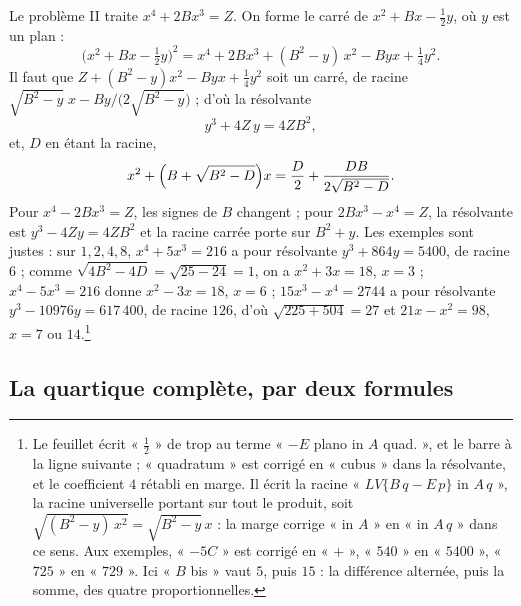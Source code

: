 \documentclass[11pt,a4paper]{article}
\begin{document}
Le problème II traite $x^4 + 2Bx^3 = Z$. On forme le carré de
$x^2 + Bx - \tfrac12 y$, où $y$ est un plan :
\[ \bigl(x^2 + Bx - \tfrac12 y\bigr)^2 = x^4 + 2Bx^3 + (B^2 - y)\,x^2 - Byx
   + \tfrac14 y^2 . \]
Il faut que $Z + (B^2 - y)x^2 - Byx + \tfrac14 y^2$ soit un carré, de racine
$\sqrt{B^2 - y}\;x - By/\bigl(2\sqrt{B^2 - y}\bigr)$ ; d'où la résolvante
\[ y^3 + 4Z\,y = 4ZB^2 , \]
et, $D$ en étant la racine,
\[ x^2 + \Bigl(B + \sqrt{B^2 - D}\Bigr)x = \frac{D}{2} + \frac{DB}{2\sqrt{B^2 - D}} . \]
Pour $x^4 - 2Bx^3 = Z$, les signes de $B$ changent ; pour $2Bx^3 - x^4 = Z$, la
résolvante est $y^3 - 4Zy = 4ZB^2$ et la racine carrée porte sur $B^2 + y$. Les
exemples sont justes : sur $1, 2, 4, 8$, $x^4 + 5x^3 = 216$ a pour résolvante
$y^3 + 864y = 5400$, de racine $6$ ; comme $\sqrt{4B^2 - 4D} = \sqrt{25 - 24} = 1$,
on a $x^2 + 3x = 18$, $x = 3$ ; $x^4 - 5x^3 = 216$ donne $x^2 - 3x = 18$, $x = 6$ ;
$15x^3 - x^4 = 2744$ a pour résolvante $y^3 - 10976y = 617\,400$, de racine $126$,
d'où $\sqrt{225 + 504} = 27$ et $21x - x^2 = 98$, $x = 7$ ou $14$.\footnote{Le
feuillet écrit « $\frac{1}{2}$ » de trop au terme « $-E$ plano in $A$ quad. », et le
barre à la ligne suivante ; « quadratum » est corrigé en « cubus » dans la
résolvante, et le coefficient $4$ rétabli en marge. Il écrit la racine
« $LV\{B\,q - E\,p\}$ in $A\,q$ », la racine universelle portant sur tout le produit,
soit $\sqrt{(B^2 - y)\,x^2} = \sqrt{B^2 - y}\,x$ : la marge corrige « in $A$ » en
« in $A\,q$ » dans ce sens. Aux exemples, « $- 5C$ » est corrigé en « $+$ », « $540$ »
en « $5400$ », « $725$ » en « $729$ ». Ici « $B$ bis » vaut $5$, puis $15$ : la
différence alternée, puis la somme, des quatre proportionnelles.}

\subsection*{La quartique complète, par deux formules}
\end{document}
